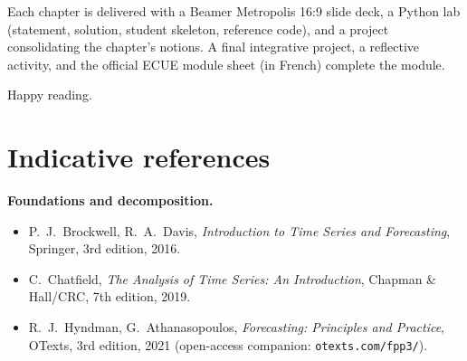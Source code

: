 \documentclass[a4paper,11pt,oneside]{book}
\begin{document}
\medskip
Each chapter is delivered with a Beamer Metropolis 16:9 slide
deck, a Python lab (statement, solution, student skeleton,
reference code), and a project consolidating the chapter's notions.
A final integrative project, a reflective activity, and the
official ECUE module sheet (in French) complete the module.

\medskip\medskip
\noindent
Happy reading.\par\medskip
\hfill\auteurNom\par
\hfill\textit{\auteurEmail}\par

\vspace*{2cm}

\tableofcontents
\thispagestyle{fancy}

\mainmatter













\backmatter

\chapter*{Indicative references}

\noindent\textbf{Foundations and decomposition.}
\begin{itemize}
  \item P.~J.~Brockwell, R.~A.~Davis, \emph{Introduction to Time
        Series and Forecasting}, Springer, 3rd edition, 2016.
  \item C.~Chatfield, \emph{The Analysis of Time Series: An
        Introduction}, Chapman \& Hall/CRC, 7th edition, 2019.
  \item R.~J.~Hyndman, G.~Athanasopoulos, \emph{Forecasting:
        Principles and Practice}, OTexts, 3rd edition, 2021
        (open-access companion: \texttt{otexts.com/fpp3/}).
\end{itemize}
\end{document}
